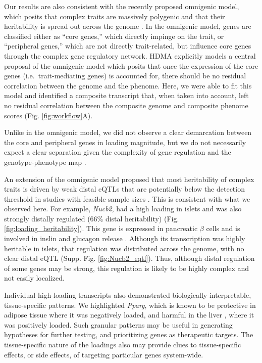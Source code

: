 \documentclass[
]{article}
\providecommand{\DIFaddtex}[1]{{\protect\color{blue}\uwave{#1}}} %
\providecommand{\DIFaddbegin}{} %
\providecommand{\DIFaddend}{} %
\providecommand{\DIFadd}[1]{\texorpdfstring{\DIFaddtex{#1}}{#1}} %
\newcommand{\DIFaddincludegraphics}[2][]{{\color{blue}\fbox{\DIFOincludegraphics[#1]{#2}}}} %
\DeclareRobustCommand{\DIFaddbegin}{\DIFOaddbegin \let\includegraphics\DIFaddincludegraphics} %
\DeclareRobustCommand{\DIFaddend}{\DIFOaddend \let\includegraphics\DIFOincludegraphics} %
\begin{document}
Our results are also consistent with the recently proposed omnigenic
model, which posits that complex traits are massively polygenic and that
their heritability is spread out across the genome \cite{pmid28622505}.
In the omnigenic model, genes are classified either as ``core genes,''
which directly impinge on the trait, or ``peripheral genes,'' which are
not directly trait-related, but influence core genes through the complex
gene regulatory network. HDMA explicitly models a central proposal of
the omnigenic model which posits that once the expression of the core
genes (i.e.~trait-mediating genes) is accounted for, there should be no
residual correlation between the genome and the phenome. Here, we were
able to fit this model and identified a composite transcript that, when
taken into account, left no residual correlation between the composite
genome and composite phenome scores (Fig. \ref{fig:workflow}A\DIFaddbegin \DIFadd{, Supp. Fig
\ref{fig:composite_cor}}\DIFaddend ).

Unlike in the omnigenic model, we did not observe a clear demarcation
between the core and peripheral genes in loading magnitude, but we do
not necessarily expect a clear separation given the complexity of gene
regulation and the genotype-phenotype map \cite{pmid29906445}.

An extension of the omnigenic model proposed that most heritability of
complex traits is driven by weak distal eQTLs that are potentially below
the detection threshold in studies with feasible sample sizes
\cite{pmid31051098}. This is consistent with what we observed here. For
example, \textit{Nucb2}, had a high loading in islets and was also
strongly distally regulated (66\% distal heritability) (Fig.
\ref{fig:loading_heritability}). This gene is expressed in pancreatic
\(\beta\) cells and is involved in inslin and glucagon release
\cite{pmid24993278, pmid23537085, pmid22108805}. Although its
transcription was highly heritable in islets, that regulation was
distributed across the genome, with no clear distal eQTL (Supp. Fig.
\ref{fig:Nucb2_eqtl}). Thus, although distal regulation of some genes
may be strong, this regulation is likely to be highly complex and not
easily localized.

Individual high-loading transcripts also demonstrated biologically
interpretable, tissue-specific patterns. We highlighted \textit{Pparg},
which is known to be protective in adipose tissue \cite{pmid17389767}
where it was negatively loaded, and harmful in the liver
\cite{pmid12805374, pmid12618528, 
pmid16357043, pmid15644454, pmid16403437}, where it was positively
loaded. Such granular patterns may be useful in generating hypotheses
for further testing, and prioritizing genes as therapeutic targets. The
tissue-specific nature of the loadings also may provide clues to
tissue-specific effects, or side effects, of targeting particular genes
system-wide.
\end{document}

